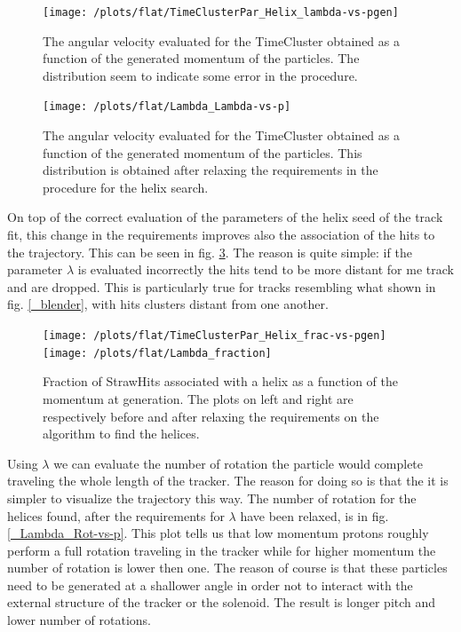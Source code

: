 \documentclass[12pt,a4paper,openright, oneside, titlepage]{book} %
\begin{document}
\begin{figure}[h!]
\centering
\texttt{[image: /plots/flat/TimeClusterPar\_Helix\_lambda-vs-pgen]}
\caption{The angular velocity evaluated for the TimeCluster obtained as a function of the generated momentum of the particles. The distribution seem to indicate some error in the procedure.}
\label{_TimeClusterMVA_Lambda-vs-p}
\end{figure}

\begin{figure}[h!]
\centering
\texttt{[image: /plots/flat/Lambda\_Lambda-vs-p]}
\caption{The angular velocity evaluated for the TimeCluster obtained as a function of the generated momentum of the particles. This distribution is obtained after relaxing the requirements in the procedure for the helix search.}
\label{_Lambda_Lambda-vs-p}
\end{figure}

\noindent On top of the correct evaluation of the parameters of the helix seed of the track fit, this change in the requirements improves also the association of the hits to the trajectory. This can be seen in fig. \ref{_active_SH_fraction}. 
The reason is quite simple: if the parameter $\lambda$ is evaluated incorrectly the hits tend to be more distant for me track and are dropped. This is particularly true for tracks resembling what shown in fig. \ref{_blender}, with hits clusters distant from one another. \\

\begin{figure}[h!]
\centering
\texttt{[image: /plots/flat/TimeClusterPar\_Helix\_frac-vs-pgen]}\hfill
\texttt{[image: /plots/flat/Lambda\_fraction]}
\caption{Fraction of StrawHits associated with a helix as a function of the momentum at generation. The plots on left and right are respectively before and after relaxing the requirements on the algorithm to find the helices.}
\label{_active_SH_fraction}
\end{figure}

\noindent Using $\lambda$ we can evaluate the number of rotation the particle would complete traveling the whole length of the tracker. 
The reason for doing so is that the it is simpler to visualize the trajectory this way. 
The number of rotation for the helices found, after the requirements for $\lambda$ have been relaxed, is in fig. \ref{_Lambda_Rot-vs-p}. 
This plot tells us that low momentum protons roughly perform a full rotation traveling in the tracker while for higher momentum the number of rotation is lower then one. 
The reason of course is that these particles need to be generated at a shallower angle in order not to interact with the external structure of the tracker or the solenoid. The result is longer pitch and lower number of rotations.\\
\end{document}
